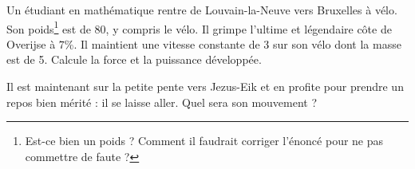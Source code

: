 

\begin{exercice}\label{exo028}

Un étudiant en mathématique rentre de Louvain-la-Neuve vers Bruxelles à vélo. Son poids\footnote{Est-ce bien un poids ? Comment il faudrait corriger l'énoncé pour ne pas commettre de faute ?} est de \unit{80}{\kilo\gram}, y compris le vélo. Il grimpe l'ultime et légendaire côte de Overijse à $7$\%. Il maintient une vitesse constante de \unit{3}{\meter\per\second} sur son vélo dont la masse est de \unit{5}{\kilogram}. Calcule la force et la puissance développée.

Il est maintenant sur la petite pente vers Jezus-Eik et en profite pour prendre un repos bien mérité : il se laisse aller. Quel sera son mouvement ?

\end{exercice}
